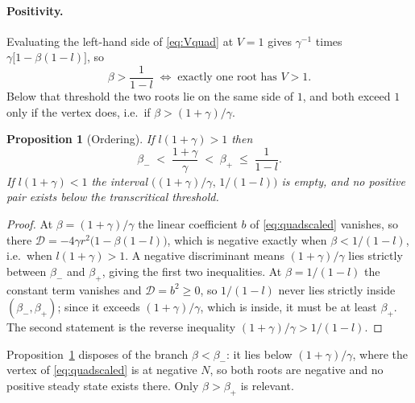 \documentclass[11pt,a4paper]{article}
\theoremstyle{plain}
\newtheorem{prop}{Proposition}
\theoremstyle{remark}
\begin{document}
\paragraph{Positivity.} Evaluating the left-hand side of \eqref{eq:Vquad} at
$V=1$ gives $\gamma^{-1}$ times $\gamma\bigl[1-\beta(1-l)\bigr]$, so
\begin{equation}
\beta > \frac{1}{1-l}
\;\Longleftrightarrow\;
\text{exactly one root has } V>1 .
\label{eq:transcritical}
\end{equation}
Below that threshold the two roots lie on the same side of $1$, and both exceed
$1$ only if the vertex does, i.e.\ if $\beta > (1+\gamma)/\gamma$.

\begin{prop}[Ordering]
\label{prop:ordering}
If $l(1+\gamma)>1$ then
\begin{equation}
\beta_- \;<\; \frac{1+\gamma}{\gamma} \;<\; \beta_+ \;\le\; \frac{1}{1-l}.
\end{equation}
If $l(1+\gamma)<1$ the interval $\bigl((1+\gamma)/\gamma,\,1/(1-l)\bigr)$ is
empty, and no positive pair exists below the transcritical threshold.
\end{prop}

\begin{proof}
At $\beta=(1+\gamma)/\gamma$ the linear coefficient $b$ of
\eqref{eq:quadscaled} vanishes, so there
$\mathcal{D} = -4\gamma r^2\bigl(1-\beta(1-l)\bigr)$, which is negative exactly
when $\beta<1/(1-l)$, i.e.\ when $l(1+\gamma)>1$. A negative discriminant means
$(1+\gamma)/\gamma$ lies strictly between $\beta_-$ and $\beta_+$, giving the
first two inequalities. At $\beta=1/(1-l)$ the constant term vanishes and
$\mathcal{D}=b^2\ge 0$, so $1/(1-l)$ never lies strictly inside
$(\beta_-,\beta_+)$; since it exceeds $(1+\gamma)/\gamma$, which is inside, it
must be at least $\beta_+$. The second statement is the reverse inequality
$(1+\gamma)/\gamma > 1/(1-l)$.
\end{proof}

Proposition~\ref{prop:ordering} disposes of the branch $\beta<\beta_-$: it lies
below $(1+\gamma)/\gamma$, where the vertex of \eqref{eq:quadscaled} is at
negative $N$, so both roots are negative and no positive steady state exists
there. Only $\beta>\beta_+$ is relevant.
\end{document}
